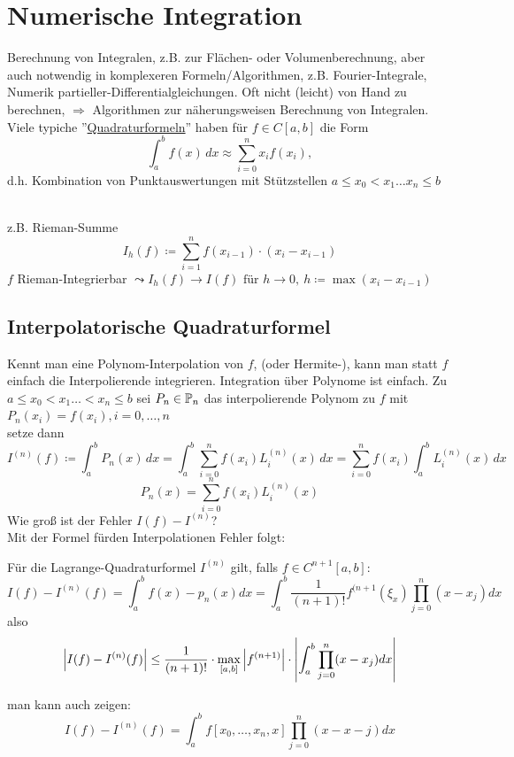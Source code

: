 \documentclass{../Skript}
\begin{document}
\section{Numerische Integration}
Berechnung von Integralen, z.B. zur Flächen- oder Volumenberechnung, 
aber auch 
notwendig in komplexeren Formeln/Algorithmen, z.B. Fourier-Integrale, 
Numerik 
partieller-Differentialgleichungen. Oft nicht (leicht) von Hand zu 
berechnen, 
\(\Rightarrow\) Algorithmen zur näherungsweisen Berechnung von 
Integralen.\\
Viele typiche ''\underline{Quadraturformeln}'' haben für \(f\in C[a,b]\)
die Form 
\[
\int^b_a f(x)\, dx \approx \sum_{i=0}^n x_i f(x_i),
\]
 d.h. Kombination von Punktauswertungen mit Stützstellen \( a\leq x_0 < 
 x_1\dots 
 x_n\leq b\)
\begin{remindexample}\hfill\\
z.B. Rieman-Summe \[
I_h(f)\coloneqq \sum_{i=1}^n f(x_{i-1})\cdot(x_i-x_{i-1})
\]
\(f\) Rieman-Integrierbar \(\leadsto I_h(f)\to I(f) \text{ für } h\to 
0, \ 
h\coloneqq \max(x_i-x_{i-1})\)\\
\end{remindexample}
\subsection{Interpolatorische Quadraturformel}
Kennt man eine Polynom-Interpolation von $f$, (oder Hermite-), kann man 
statt $f$ 
einfach die Interpolierende integrieren. Integration über Polynome ist 
einfach.
Zu \(a\leq x_0 <x_1\dots < x_n\leq b\) sei \(P_n\in\mathbb{P}_n\) das 
interpolierende 
Polynom zu \(f\) mit \(P_n(x_i)=f(x_i), i=0,\dots, n\)\\
setze dann \[
I^{(n)}(f)\coloneqq \int^b_aP_n(x)\, dx =\int^b_a \sum_{i=0}^n 
f(x_i)L^{(n)}_i(x)\, dx = \sum_{i=0}^n f(x_i)\int^b_a L^{(n)}_i(x)\, dx
\]
\[
P_n(x)=\sum_{i=0}^n f(x_i)L^{(n)}_i(x)
\]
Wie groß ist der Fehler \(I(f)-I^{(n)}\)?\\
Mit der Formel fürden Interpolationen Fehler folgt:

\begin{theorem}
    Für die Lagrange-Quadraturformel $I^{(n)}$ gilt, falls $f \in
    C^{n+1}[a,b]$:\[
        I(f) - I^{(n)}(f) = \int_a^b f(x) - p_n(x) dx = \int_a^b\frac{1}
        {(n+1)!}
        f^{(n+1}(\xi_x)\prod_{j=0}^n(x-x_j)dx
    \]
    also \[   
        \left\vert I(f) - I^{(n)}(f) \right\vert \leq \frac{1}{(n+1)!}\cdot 
        \max\limits_{[a,b]}
        \left\vert f^{(n+1)} \right\vert\cdot \left\vert \int_a^b\prod_{j=0}^n(x-x_j) dx \right\vert
    \]
\end{theorem}
\begin{remark}
    man kann auch zeigen:\[
    I(f) - I^{(n)}(f) = \int_a^b f[x_0, \dots, x_n, x] \prod_{j=0}^n(x-
    x-j)dx
    \] 
\end{remark}
\end{document}
